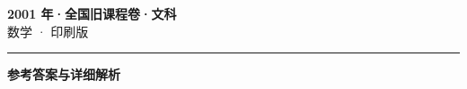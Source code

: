 \documentclass[zihao=5, a4paper]{ctexart}
\begin{document}
\begin{center}
  {\Large\bfseries 2001 年·全国旧课程卷·文科}\\[4pt]
  {\large 数学 · 印刷版}
\end{center}
\medskip
{}

\par\bigskip\hrule\bigskip
{}
\begin{center}{\large\bfseries 参考答案与详细解析}\end{center}
\smallskip

\end{document}
